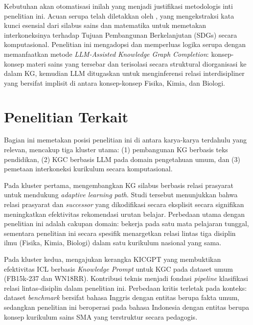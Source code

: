 \documentclass[main]{subfiles}
\begin{document}
Kebutuhan akan otomatisasi inilah yang menjadi justifikasi metodologis
inti penelitian ini. Acuan serupa telah diletakkan oleh
\textcite{said_mapping_2024}, yang mengekstraksi kata kunci esensial dari silabus sains dan
matematika untuk memetakan interkoneksinya terhadap Tujuan Pembangunan
Berkelanjutan (SDGs) secara komputasional. Penelitian ini mengadopsi dan
memperluas logika serupa dengan memanfaatkan metode \textit{LLM-Assisted
Knowledge Graph Completion}: konsep-konsep materi sains yang tersebar
dan terisolasi secara struktural diorganisasi ke dalam KG, kemudian LLM
ditugaskan untuk menginferensi relasi interdisipliner yang bersifat
implisit di antara konsep-konsep Fisika, Kimia, dan Biologi.

\section{Penelitian Terkait}

Bagian ini memetakan posisi penelitian ini di antara karya-karya
terdahulu yang relevan, mencakup tiga kluster utama: (1) pembangunan KG
berbasis teks pendidikan, (2) KGC berbasis LLM pada domain pengetahuan
umum, dan (3) pemetaan interkoneksi kurikulum secara komputasional.

Pada kluster pertama, \textcite{zhang_learning_2023} mengembangkan KG silabus
berbasis relasi prasyarat untuk mendukung \textit{adaptive learning
path}. Studi tersebut menunjukkan bahwa relasi prasyarat dan \textit{successor}
yang dikodifikasi secara eksplisit secara signifikan meningkatkan
efektivitas rekomendasi urutan belajar. Perbedaan utama dengan penelitian
ini adalah cakupan domain: \citeauthor{zhang_learning_2023} bekerja pada satu mata pelajaran
tunggal, sementara penelitian ini secara spesifik menargetkan relasi
lintas tiga disiplin ilmu (Fisika, Kimia, Biologi) dalam satu kurikulum
nasional yang sama.

Pada kluster kedua, \textcite{wei_kicgpt_2023} mengajukan kerangka KICGPT yang
membuktikan efektivitas ICL berbasis \textit{Knowledge Prompt} untuk KGC pada
dataset umum (FB15k-237 dan WN18RR). Kontribusi teknis \citeauthor{wei_kicgpt_2023}
menjadi fondasi \textit{pipeline} klasifikasi relasi lintas-disiplin dalam
penelitian ini. Perbedaan kritis terletak pada konteks: dataset
\textit{benchmark} \citeauthor{wei_kicgpt_2023} bersifat bahasa Inggris dengan entitas
berupa fakta umum, sedangkan penelitian ini beroperasi pada bahasa
Indonesia dengan entitas berupa konsep kurikulum sains SMA yang
terstruktur secara pedagogis.
\end{document}
